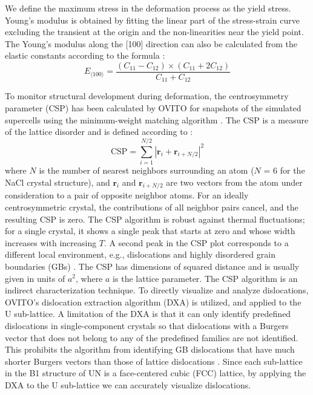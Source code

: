 \documentclass[applsci,article,submit,pdftex,moreauthors]{Definitions/mdpi}
\newcommand{\?}{\stackrel{?}{=}}
\begin{document}
We define the maximum stress in the deformation process as the yield stress. Young's modulus is obtained by fitting the linear part of the stress-strain curve excluding the transient at the origin and the non-linearities near the yield point. The Young's modulus along the [100] direction can also be calculated from the elastic constants according to the formula \cite{Rosler2007}:
\begin{equation}
E_{\langle 100 \rangle} = \frac{(C_{11}-C_{12}) \times (C_{11}+2 C_{12})}{C_{11}+C_{12}}
\label{Eq:E100}
\end{equation}


To monitor structural development during deformation, the centrosymmetry parameter (CSP) has been calculated by OVITO for snapshots of the simulated supercells using the minimum-weight matching algorithm \cite{Larsen2020}. The CSP is a measure of the lattice disorder and is defined according to \cite{Kelchner1998}:
\begin{equation}
\mathrm{CSP} = \sum_{i=1}^{N/2} |\mathbf{r}_i + \mathbf{r}_{i+N/2}|^{2} 
\end{equation}
where $N$ is the number of nearest neighbors surrounding an atom ($N$ = 6 for the NaCl crystal structure), and $\mathbf{r}_i$ and $\mathbf{r}_{i+N/2}$ are two vectors from the atom under consideration to a pair of opposite neighbor atoms. For an ideally centrosymmetric crystal, the contributions of all neighbor pairs cancel, and the resulting CSP is zero. The CSP algorithm is robust against thermal fluctuations; for a single crystal, it shows a single peak that starts at zero and whose width increases with increasing $T$. A second peak in the CSP plot corresponds to a different local environment, e.g., dislocations and highly disordered grain boundaries (GBs) \cite{Bulatov2006, Larsen2020}. The CSP has dimensions of squared distance and is usually given in units of $a^2$, where $a$ is the lattice parameter. The CSP algorithm is an indirect characterization technique. To directly visualize and analyze dislocations, OVITO's dislocation extraction algorithm (DXA) \cite{Stukowski2012} is utilized, and applied to the U sub-lattice. A limitation of the DXA is that it can only identify predefined dislocations in single-component crystals so that dislocations with a Burgers vector that does not belong to any of the predefined families are not identified. This prohibits the algorithm from identifying GB dislocations that have much shorter Burgers vectors than those of lattice dislocations \cite{Cai2016}. Since each sub-lattice in the B1 structure of UN is a face-centered cubic (FCC) lattice, by applying the DXA to the U sub-lattice we can accurately visualize dislocations. 
\end{document}

